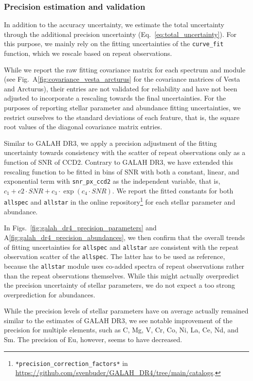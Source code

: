 \documentclass[
  journal=pasa,
  manuscript=research-paper, %
  year=2024,
  volume=37
]{cup-journal}
\begin{document}
\subsubsection{Precision estimation and validation} \label{sec:uncertainty_precision}

In addition to the accuracy uncertainty, we estimate the total uncertainty through the additional precision uncertainty (Eq.~\ref{eq:total_uncertainty}). For this purpose, we mainly rely on the fitting uncertainties of the \texttt{curve\_fit} function, which we rescale based on repeat observations.

While we report the raw fitting covariance matrix for each spectrum and module (see Fig.~A\ref{fig:covariance_vesta_arcturus} for the covariance matrices of Vesta and Arcturus), their entries are not validated for reliability and have not been adjusted to incorporate a rescaling towards the final uncertainties. For the purposes of reporting stellar parameter and abundance fitting uncertainties, we restrict ourselves to the standard deviations of each feature, that is, the square root values of the diagonal covariance matrix entries.

Similar to GALAH DR3, we apply a precision adjustment of the fitting uncertainty towards consistency with the scatter of repeat observations only as a function of SNR of CCD2. Contrary to GALAH DR3, we have extended this rescaling function to be fitted in bins of SNR with both a constant, linear, and exponential term with \texttt{snr\_px\_ccd2} as the independent variable, that is, $c_1 + c2 \cdot SNR + c_3 \cdot \exp(c_4 \cdot SNR)$. We report the fitted constants for both \texttt{allspec} and \texttt{allstar} in the online repository\footnote{\texttt{*precision\_correction\_factors*} in \url{https://github.com/svenbuder/GALAH_DR4/tree/main/catalogs}.} for each stellar parameter and abundance. 

In Figs.~\ref{fig:galah_dr4_precision_parameters} and A\ref{fig:galah_dr4_precision_abundances}, we then confirm that the overall trends of fitting uncertainties for \texttt{allspec} and \texttt{allstar} are consistent with the repeat observation scatter of the \texttt{allspec}. The latter has to be used as reference, because the \texttt{allstar} module uses co-added spectra of repeat observations rather than the repeat observations themselves. While this might actually overpredict the precision uncertainty of stellar parameters, we do not expect a too strong overprediction for abundances.

While the precision levels of stellar parameters have on average actually remained similar to the estimates of GALAH DR3, we see notable improvement of the precision for multiple elements, such as C, Mg, V, Cr, Co, Ni, La, Ce, Nd, and Sm. The precision of Eu, however, seems to have decreased.
\end{document}
